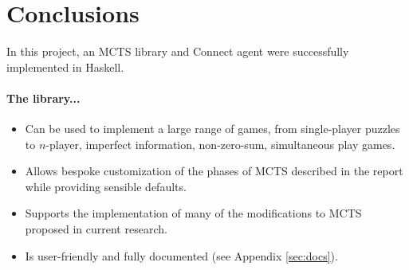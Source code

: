 \chapter{Conclusions}
In this project, an MCTS library and Connect agent were successfully implemented in Haskell.
\subsubsection{The library...}
\begin{itemize}
\item[] Can be used to implement a large range of games, from single-player puzzles to $n$-player, imperfect information, non-zero-sum, simultaneous play games.
\item[] Allows bespoke customization of the phases of {MCTS} described in the report while providing sensible defaults.
\item[] Supports the implementation of many of the modifications to {MCTS} proposed in current research.
\item[] Is user-friendly and fully documented (see Appendix \ref{sec:docs}).
\end{itemize}

